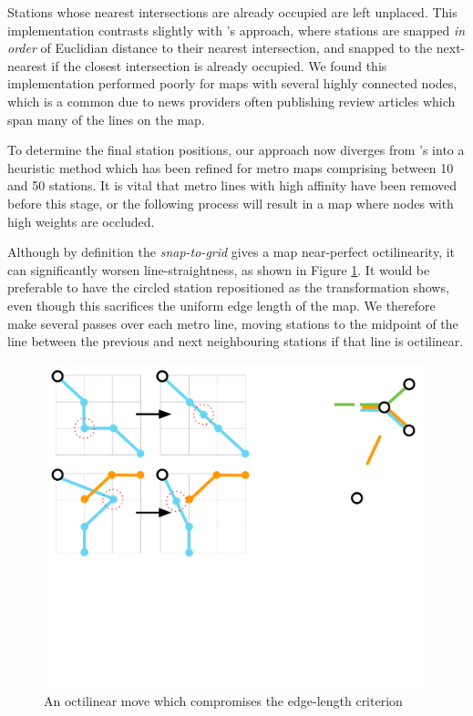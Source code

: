 Stations whose nearest intersections are already occupied are left unplaced. This implementation contrasts slightly with \citeauthor{AutomaticMetroMapLayoutThesis}'s approach, where stations are snapped \textit{in order} of Euclidian distance to their nearest intersection, and snapped to the next-nearest if the closest intersection is already occupied. We found this implementation performed poorly for maps with several highly connected nodes, which is a common due to news providers often publishing review articles which span many of the lines on the map.

To determine the final station positions, our approach now diverges from \citeauthor{AutomaticMetroMapLayoutThesis}'s into a heuristic method which has been refined for metro maps comprising between 10 and 50 stations. It is vital that metro lines with high affinity have been removed before this stage, or the following process will result in a map where nodes with high weights are occluded.

Although by definition the \textit{snap-to-grid} gives a map near-perfect octilinearity, it can significantly worsen line-straightness, as shown in Figure \ref{fig:aoct}. It would be preferable to have the circled station repositioned as the transformation shows, even though this sacrifices the uniform edge length of the map. We therefore make several passes over each metro line, moving stations to the midpoint of the line between the previous and next neighbouring stations if that line is octilinear.
\begin{figure}[htbp!]
	\centering
	\includegraphics[width=.7\textwidth]{img/implementation/averagingoctilinear.pdf}
	\caption{An octilinear move which compromises the edge-length criterion}
	\label{fig:aoct}
\end{figure}

